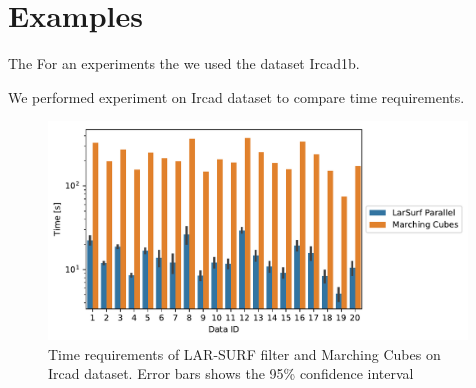 \section{Examples}\label{sec:examples}


The 
For an experiments the we used the dataset Ircad1b. 

\begin{table}

\end{table}
\begin{table}

\end{table}


We performed experiment on Ircad dataset to compare time requirements. 


\begin{figure}
\includegraphics[width=0.99\textwidth]{figs/ircad_comparison.pdf} 
\caption{Time requirements of LAR-SURF filter and Marching Cubes on Ircad dataset. Error bars shows the 95\% confidence interval}
\end{figure}